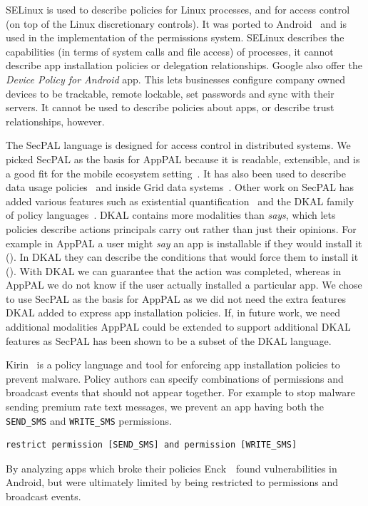 \documentclass[]{llncs}
\newcommand{\citep}[1]{\cite{#1}}
\begin{document}
SELinux is used to describe policies for Linux processes, and for access control (on top of the Linux discretionary controls).
It was ported to Android~\cite{Smalley:2013vl} and is used in the implementation of the permissions system.
SELinux describes the capabilities (in terms of system calls and file access) of processes, it cannot describe app installation policies or delegation relationships.
Google also offer the \emph{Device Policy for Android} app.
This lets businesses configure company owned devices to be trackable, remote lockable, set passwords and sync with their servers.
It cannot be used to describe policies about apps, or describe trust relationships, however.

The SecPAL language is designed for access control in distributed systems.
We picked SecPAL as the basis for AppPAL because it is readable, extensible, and is a good fit for the mobile ecosystem setting~\citep{Hallett:2014un}.
It has also been used to describe data usage policies~\cite{Aziz:2011vt} and inside Grid data systems~\cite{Humphrey:2007wc}.
Other work on SecPAL has added various features such as existential quantification~\cite{Becker:2009vt} and the DKAL family of policy languages~\cite{Gurevich:2008fz,Gurevich:Qo5E3M3}.
DKAL contains more modalities than \emph{says}, which lets policies describe actions principals carry out rather than just their opinions.
For example in AppPAL a user might \emph{say} an app is installable if they would install it ().
In DKAL they can describe the conditions that would force them to install it ().
With DKAL we can guarantee that the action was completed, whereas in AppPAL we do not know if the user actually installed a particular app.
We chose to use SecPAL as the basis for AppPAL as we did not need the extra features DKAL added to express app installation policies.
If, in future work, we need additional modalities AppPAL could be extended to support additional DKAL features as SecPAL has been shown to be a subset of the DKAL language.

Kirin~\cite{Enck:2009ko} is a policy language and tool for enforcing app installation policies to prevent malware.
Policy authors can specify combinations of permissions and broadcast events that should not appear together.
For example to stop malware sending premium rate text messages, we prevent an app having both the \texttt{SEND\_SMS} and \texttt{WRITE\_SMS} permissions.
\begin{lstlisting}
restrict permission [SEND_SMS] and permission [WRITE_SMS]
\end{lstlisting}
By analyzing apps which broke their policies Enck~\etal~found vulnerabilities in Android, but were ultimately limited by being restricted to permissions and broadcast events.
\end{document}
